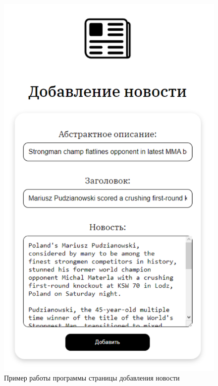 \begin{figure}[H]
	\centering
	\includegraphics[scale=1]{img/prog_3.pdf}
	\caption{Пример работы программы страницы добавления новости}
	\label{prog_3}
\end{figure}  

